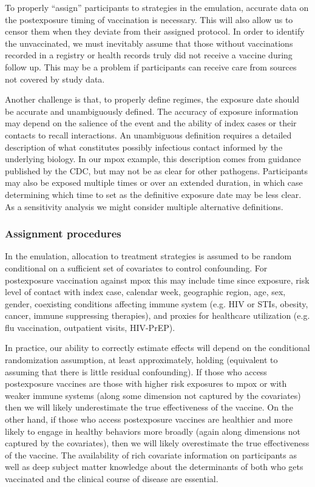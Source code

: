 \documentclass[11pt]{article}
\begin{document}
To properly ``assign'' participants to strategies in the emulation, accurate data on the postexposure timing of vaccination is necessary. This will also allow us to censor them when they deviate from their assigned protocol. In order to identify the unvaccinated, we must inevitably assume that those without vaccinations recorded in a registry or health records truly did not receive a vaccine during follow up. This may be a problem if participants can receive care from sources not covered by study data. 

Another challenge is that, to properly define regimes, the exposure date should be accurate and unambiguously defined. The accuracy of exposure information may depend on the salience of the event and the ability of index cases or their contacts to recall interactions. An unambiguous definition requires a detailed description of what constitutes possibly infectious contact informed by the underlying biology. In our mpox example, this description comes from guidance published by the CDC, but may not be as clear for other pathogens. Participants may also be exposed multiple times or over an extended duration, in which case determining which time to set as the definitive exposure date may be less clear. As a sensitivity analysis we might consider multiple alternative definitions.

\subsubsection*{Assignment procedures}
In the emulation, allocation to treatment strategies is assumed to be random conditional on a sufficient set of covariates to control confounding. For postexposure vaccination against mpox this may include time since exposure, risk level of contact with index case, calendar week, geographic region, age, sex, gender, coexisting conditions affecting immune system (e.g. HIV or STIs, obesity, cancer, immune suppressing therapies), and proxies for healthcare utilization (e.g. flu vaccination, outpatient visits, HIV-PrEP).

In practice, our ability to correctly estimate effects will depend on the conditional randomization assumption, at least approximately, holding (equivalent to assuming that there is little residual confounding). If those who access postexposure vaccines are those with higher risk exposures to mpox or with weaker immune systems (along some dimension not captured by the covariates) then we will likely underestimate the true effectiveness of the vaccine. On the other hand, if those who access postexposure vaccines are healthier and more likely to engage in healthy behaviors more broadly (again along dimensions not captured by the covariates), then we will likely overestimate the true effectiveness of the vaccine. The availability of rich covariate information on participants as well as deep subject matter knowledge about the determinants of both who gets vaccinated and the clinical course of disease are essential.
\end{document}
